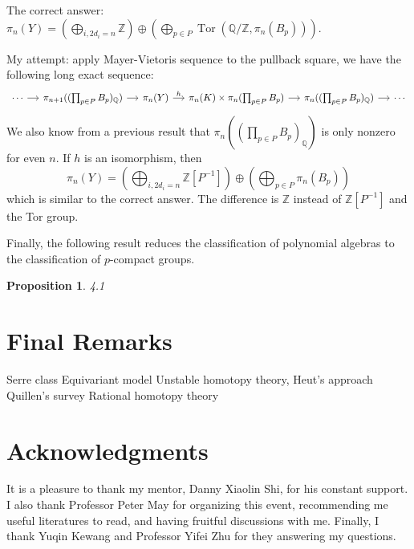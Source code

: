 \documentclass[psamsfonts]{amsart}
\newtheorem{prop}{Proposition}[section]
\theoremstyle{definition}
\newcommand{\Q}{\mathbb{Q}}
\newcommand{\Z}{\mathbb{Z}}
\DeclareMathOperator{\Tor}{Tor}
\numberwithin{equation}{section}
\begin{document}
\noindent The correct answer: $\pi_n(Y)=(\bigoplus_{i,2d_i=n}\Z)\oplus(\bigoplus_{p\in P}\Tor(\Q/\Z,\pi_n(B_p)))$.\medbreak

\noindent My attempt: apply Mayer-Vietoris sequence to the pullback square, we have the following long exact sequence:
\[\begin{tikzcd}[column sep=small]
\cdots\arrow[r]&\pi_{n+1}((\prod_{p\in P}B_p)_\Q)\arrow[r]&\pi_n(Y)\arrow[r,"h"]&\pi_n(K)\times\pi_n(\prod_{p\in P}B_p)\arrow[r]&\pi_n((\prod_{p\in P}B_p)_\Q)\arrow[r]&\cdots
\end{tikzcd}\]
We also know from a previous result that $\pi_n((\prod_{p\in P}B_p)_\Q)$ is only nonzero for even $n$. If $h$ is an isomorphism, then
\[\textstyle{\pi_n(Y)=(\bigoplus_{i,2d_i=n}\Z[P^{-1}])\oplus(\bigoplus_{p\in P}\pi_n(B_p))}\]
which is similar to the correct answer. The difference is $\Z$ instead of $\Z[P^{-1}]$ and the Tor group.

Finally, the following result reduces the classification of polynomial algebras to the classification of $p$-compact groups.

\begin{prop}
4.1
\end{prop}


\section{Final Remarks}

Serre class
Equivariant model
Unstable homotopy theory, Heut's approach
Quillen's survey
Rational homotopy theory

\section*{Acknowledgments}

It is a pleasure to thank my mentor, Danny Xiaolin Shi, for his constant support. I also thank Professor Peter May for organizing this event, recommending me useful literatures to read, and having fruitful discussions with me. Finally, I thank Yuqin Kewang and Professor Yifei Zhu for they answering my questions.
\end{document}
